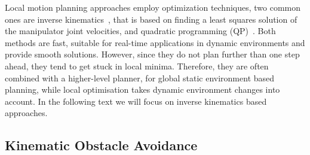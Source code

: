 \documentclass[]{article}
\begin{document}
Local motion planning approaches employ optimization techniques, two common ones are inverse kinematics~\cite{c29,c38}, that is based on finding a least squares solution of the manipulator joint velocities, and quadratic programming (QP)~\cite{c21,c22, haviland2021neo, c23}.  Both methods are fast, suitable for real-time applications in dynamic environments and provide smooth solutions. However, since they do not plan further than one step ahead, they tend to get stuck in local minima. Therefore, they are often combined with a higher-level planner, for global static environment based  planning, while local optimisation takes dynamic environment changes into account. In the following text we will focus on inverse kinematics based approaches.

\subsection{Kinematic Obstacle Avoidance}


\end{document}
